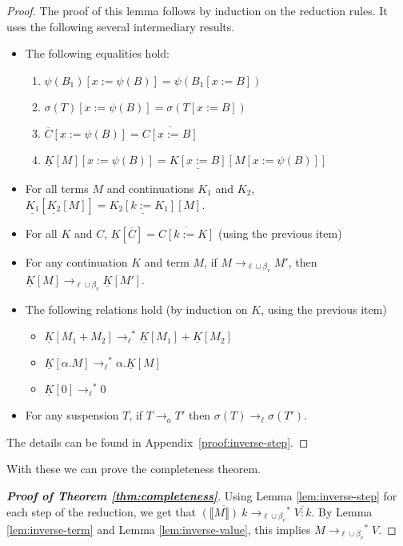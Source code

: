 \documentclass{LMCS}
\newcommand{\App}[1]{The details can be found in Appendix~\ref{proof:#1}}
\newcommand{\xto}[1]{\ensuremath{\rightarrow_{#1}}}
\newcommand{\tolinred}{\xto{\ell}}
\newcommand{\toalgred}{\xto{a}}
\newcommand{\stolinred}{\ensuremath{\xto{\ell}^{\ast}}}
\newcommand{\toblinred}{\xto{\ell\cup\beta_v}}
\newcommand{\stoblinred}{\ensuremath{\xto{\ell\cup\beta_v}^{\ast}}}
\newcommand{\wt}[1]{\llbracket{#1}\rrbracket}
\begin{document}
\begin{proof}
  The proof of this lemma follows by induction on the reduction rules.
  It uses the following several intermediary results.
  \begin{itemize}
    \item 
      The following equalities hold:
      \begin{enumerate}
	\item $\psi(B_{1})[x:=\psi(B)]=\psi(B_{1}[x:=B])$
	\item $\sigma(T)[x:=\psi(B)]=\sigma(T[x:=B])$
	\item $\overline{C}[x:=\psi(B)]=\overline{C[x:=B]}$
	\item
	  $\underline{K}[M][x:=\psi(B)]=\underline{K[x:=B]}[M[x:=\psi(B)]]$
      \end{enumerate}
    \item 
      For all terms $M$ and continuations
      $K_{1}$ and $K_{2}$, 
      $
      \underline{K_{1}}[\underline{K_{2}}[M]]\!=\!\underline{K_{2}[k:=K_{1}]}[M]
      $.
    \item For all $K$ and $C$,
      $\underline{K}[\overline{C}]=\overline{C[k:=K]}$ (using the
      previous item)
    \item For any continuation $K$ and term
      $M$, if $M\toblinred M'$, then
      $\underline{K}[M]\toblinred\underline{K}[M']$.
    \item 
      The following relations hold (by induction on $K$, using the
      previous item)
      \begin{itemize}
	\item $\underline{K}[M_{1}+M_{2}]\stolinred\underline{K}[M_{1}]+\underline{K}[M_{2}]$
	\item $\underline{K}[\alpha.M]\stolinred\alpha.\underline{K}[M]$
	\item $\underline{K}[0]\stolinred0$
      \end{itemize}
    \item For any suspension $T$, if $T\toalgred T'$
      then $\sigma(T)\tolinred\sigma(T')$.  
  \end{itemize}
  \App{inverse-step}.
\end{proof}

With these we can prove the completeness theorem.

\begin{proof}[\bf Proof of Theorem \ref{thm:completeness}]
  Using Lemma \ref{lem:inverse-step} for each step of the reduction,
  we get that $\overline{(\wt M)~k}\stoblinred\overline{V:k}$. By Lemma
  \ref{lem:inverse-term} and Lemma \ref{lem:inverse-value}, this implies
  $M\stoblinred V$.
\end{proof}
\end{document}
